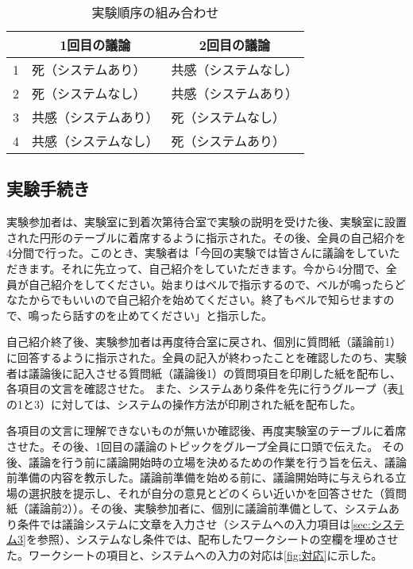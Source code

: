 \documentclass[11pt, a4paper]{jreport} %
\begin{document}
\begin{table}[]
\caption{実験順序の組み合わせ}
\centering
\label{tab:順序}
\begin{tabular}{@{}lll@{}}
\toprule
  & \multicolumn{1}{c}{1回目の議論} & \multicolumn{1}{c}{2回目の議論} \\ \midrule
1 & 死（システムあり）                  & 共感（システムなし）                 \\
2 & 死（システムなし）                  & 共感（システムあり）                 \\
3 & 共感（システムあり）                 & 死（システムなし）                  \\
4 & 共感（システムなし）                 & 死（システムあり）                  \\ \bottomrule
\end{tabular}
\end{table}


\subsection{実験手続き}
実験参加者は、実験室に到着次第待合室で実験の説明を受けた後、実験室に設置された円形のテーブルに着席するように指示された。その後、全員の自己紹介を4分間で行った。このとき、実験者は「今回の実験では皆さんに議論をしていただきます。それに先立って、自己紹介をしていただきます。今から4分間で、全員が自己紹介をしてください。始まりはベルで指示するので、ベルが鳴ったらどなたからでもいいので自己紹介を始めてください。終了もベルで知らせますので、鳴ったら話すのを止めてください」と指示した。


自己紹介終了後、実験参加者は再度待合室に戻され、個別に質問紙（議論前1）に回答するように指示された。全員の記入が終わったことを確認したのち、実験者は議論後に記入させる質問紙（議論後1）の質問項目を印刷した紙を配布し、各項目の文言を確認させた。
また、システムあり条件を先に行うグループ（表\ref{tab:順序}の1と3）に対しては、システムの操作方法が印刷された紙を配布した。

各項目の文言に理解できないものが無いか確認後、再度実験室のテーブルに着席させた。その後、1回目の議論のトピックをグループ全員に口頭で伝えた。
その後、議論を行う前に議論開始時の立場を決めるための作業を行う旨を伝え、議論前準備の内容を教示した。議論前準備を始める前に、議論開始時に与えられる立場の選択肢を提示し、それが自分の意見とどのくらい近いかを回答させた（質問紙（議論前2））。その後、実験参加者に、個別に議論前準備として、システムあり条件では議論システムに文章を入力させ（システムへの入力項目は\ref{sec:システム3}を参照）、システムなし条件では、配布したワークシートの空欄を埋めさせた。ワークシートの項目と、システムへの入力の対応は\ref{fig:対応}に示した。
\end{document}
